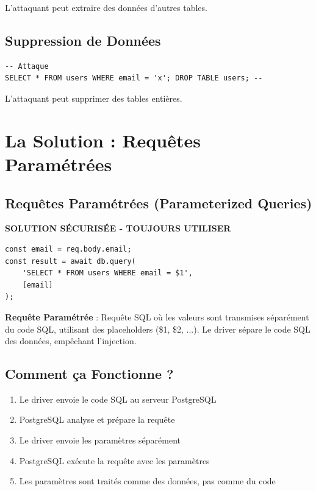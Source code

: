 L'attaquant peut extraire des données d'autres tables.

\subsection{Suppression de Données}

\begin{lstlisting}[style=sql]
-- Attaque
SELECT * FROM users WHERE email = 'x'; DROP TABLE users; --
\end{lstlisting}

L'attaquant peut supprimer des tables entières.

\section{La Solution : Requêtes Paramétrées}

\subsection{Requêtes Paramétrées (Parameterized Queries)}

\begin{bestpracticebox}
    \textbf{SOLUTION SÉCURISÉE - TOUJOURS UTILISER}
    
    \begin{lstlisting}[style=javascript]
const email = req.body.email;
const result = await db.query(
    'SELECT * FROM users WHERE email = $1',
    [email]
);
    \end{lstlisting}
\end{bestpracticebox}

\begin{definitionbox}
    \textbf{Requête Paramétrée} : Requête SQL où les valeurs sont transmises séparément du code SQL, utilisant des placeholders (\$1, \$2, ...). Le driver sépare le code SQL des données, empêchant l'injection.
\end{definitionbox}

\subsection{Comment ça Fonctionne ?}

\begin{enumerate}
    \item Le driver envoie le code SQL au serveur PostgreSQL
    \item PostgreSQL analyse et prépare la requête
    \item Le driver envoie les paramètres séparément
    \item PostgreSQL exécute la requête avec les paramètres
    \item Les paramètres sont traités comme des données, pas comme du code
\end{enumerate}

